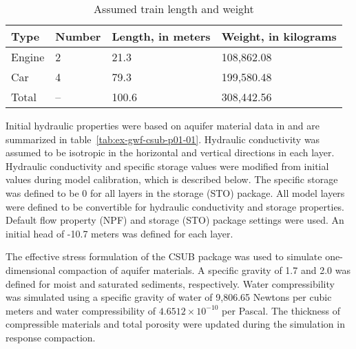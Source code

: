 \small
\begin{longtable}[!htbp]{
                                      p{}
                                      p{}
                                      p{}
                                      p{}
                                      }
	\caption{Assumed train length and weight} \label{tab:ex-gwf-csub-p01-train} \\

	\hline \hline
	\rowcolor{Gray}
	\textbf{Type} & \textbf{Number} & \textbf{Length, in meters} & \textbf{Weight, in kilograms}  \\
	\hline
	\endhead
	
	Engine & 2 &  21.3 &   108,862.08 \\
	Car      & 4 &    79.3 &   199,580.48 \\ 
	\hline
	Total     & -- & 100.6 &   308,442.56 \\ 
	\hline \hline
\end{longtable}
\normalsize

Initial hydraulic properties were based on aquifer material data in \cite{freeze1979groundwater} and are summarized in table~\ref{tab:ex-gwf-csub-p01-01}. Hydraulic conductivity was assumed to be isotropic in the horizontal and vertical directions in each layer. Hydraulic conductivity and specific storage values were modified from initial values during model calibration, which is described below. The specific storage was defined to be 0 for all layers in the storage (STO) package. All model layers were defined to be convertible for hydraulic conductivity and storage properties. Default flow property (NPF) and storage (STO) package settings were used. An initial head of -10.7 meters was defined for each layer.



The effective stress formulation of the CSUB package was used to simulate one-dimensional compaction of aquifer materials. A specific gravity of 1.7 and 2.0 was defined for moist and saturated sediments, respectively. Water compressibility was simulated using a specific gravity of water of 9,806.65 Newtons per cubic meters and water compressibility of $4.6512 \times 10^{-10}$ per Pascal. The thickness of compressible materials and total porosity were updated during the simulation in response compaction.

